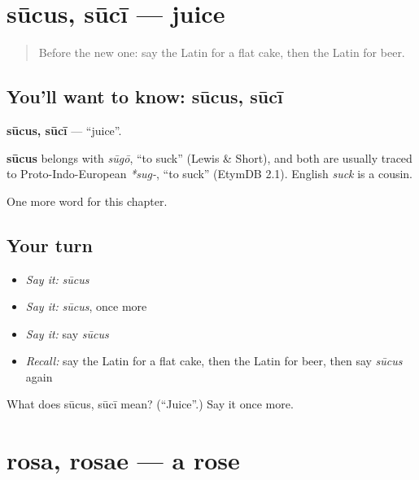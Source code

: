 \section[sūcus, sūcī]{sūcus, sūcī — juice}

\label{lesson:LA-C128-sucus}



\begin{quote}
Before the new one: say the Latin for a flat cake, then the Latin for beer.
\end{quote}

\subsection*{You'll want to know: sūcus, sūcī}
\textbf{sūcus, sūcī} — \textquotedblleft{}juice\textquotedblright{}.

\begin{cousinweb}
\textbf{sūcus} belongs with \emph{sūgō}, \textquotedblleft{}to suck\textquotedblright{} (Lewis \& Short), and both are usually traced to Proto-Indo-European \emph{*sug-}, \textquotedblleft{}to suck\textquotedblright{} (EtymDB 2.1). English \emph{suck} is a cousin.
\end{cousinweb}

\begin{grammarlens}[title={What you've built}]
One more word for this chapter.
\end{grammarlens}

\subsection*{Your turn}
\begin{itemize}
\raggedright
  \item \emph{Say it:} \emph{sūcus}
  \item \emph{Say it:} \emph{sūcus}, once more
  \item \emph{Say it:} say \emph{sūcus}
  \item \emph{Recall:} say the Latin for a flat cake, then the Latin for beer, then say \emph{sūcus} again
\end{itemize}

\begin{tcolorbox}[breakable,colback=teal!4,colframe=teal!35!black,title={Before you move on}]
What does sūcus, sūcī mean? (\textquotedblleft{}Juice\textquotedblright{}.) Say it once more.
\end{tcolorbox}
\section[rosa, rosae]{rosa, rosae — a rose}

